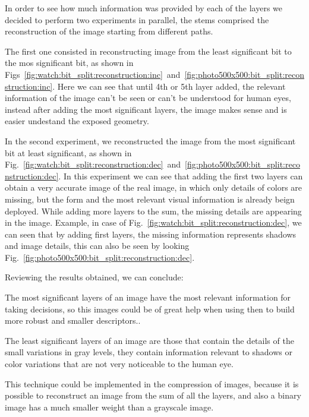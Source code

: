 \documentclass[journal]{IEEEtran}
\begin{document}
In order to see how much information was provided by each of the layers we decided to perform two experiments in parallel, the stems comprised the reconstruction of the image starting from different paths.

The first one consisted in reconstructing image from the least significant bit to the mos significant bit, as shown in  Figs~\ref{fig:watch:bit_split:reconstruction:inc}~and~\ref{fig:photo500x500:bit_split:reconstruction:inc}. Here we can see that until 4th or 5th layer added, the relevant information of the image can't be seen or can't be understood for human eyes, instead after adding the most significant layers, the image makes sense and is easier undestand the exposed geometry.

In the second experiment, we reconstructed the image from the most significant bit at least significant, as shown in Fig.~\ref{fig:watch:bit_split:reconstruction:dec}~and~\ref{fig:photo500x500:bit_split:reconstruction:dec}. In this experiment we can see that adding the first two layers can obtain a very accurate image of the real image, in which only details of colors are missing, but the form and the most relevant visual information is already beign deployed. While adding more layers to the sum, the missing details are appearing in the image. Example, in case of Fig.~\ref{fig:watch:bit_split:reconstruction:dec}, we can seen that by adding first layers, the missing information represents shadows and image details, this can also be seen by looking Fig.~\ref{fig:photo500x500:bit_split:reconstruction:dec}.

Reviewing the results obtained, we can conclude: 
\begin{enumerate*}
	\item The most significant layers of an image have the most relevant information for taking decisions, so this images could be of great help when using then to build more robust and smaller descriptors..
	\item The least significant layers of an image are those that contain the details of the small variations in gray levels, they contain information relevant to shadows or color variations that are not very noticeable to the human eye.
	\item This technique could be implemented in the compression of images, because it is possible to reconstruct an image from the sum of all the layers, and also a binary image has a much smaller weight than a grayscale image.
\end{enumerate*}
\end{document}
